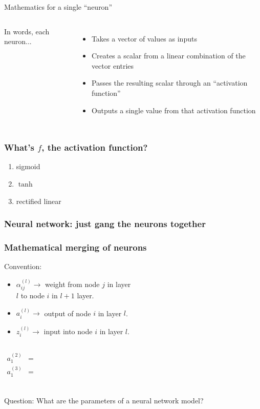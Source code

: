 \documentclass[mathserif, aspectratio=169]{beamer}
\begin{document}
\begin{frame}{Mathematics for a single ``neuron''}   
    \begin{columns}
    		In words, each neuron...
    		\begin{itemize}
    			\item Takes a vector of values as inputs
    			\item Creates a scalar from a linear combination of the vector entries
    			\item Passes the resulting scalar through an ``activation function''
    			\item Outputs a single value from that activation function
    		\end{itemize}
	    	
    \end{columns}
\end{frame}


\begin{frame}[t]\frametitle{What's $f$, the activation function?}
    \begin{enumerate}
    	\item sigmoid
    	\vspace{15mm}
    	\item $\tanh$
    	\vspace{15mm}
    	\item rectified linear
    \end{enumerate}
\end{frame}

\begin{frame}[t]\frametitle{Neural network: just gang the neurons together}
    
\end{frame}


\begin{frame}[t]\frametitle{Mathematical merging of neurons}
    Convention:
    \begin{itemize}
    	\item $\alpha_{ij}^{(l)} \rightarrow$ weight from node $j$ in layer\\ $l$ to node $i$ in $l+1$ layer.
    	\item $a_{i}^{(l)} \rightarrow$ output of node $i$ in layer $l$.
    	\item $z_i^{(l)} \rightarrow$ input into node $i$ in layer $l$.
    \end{itemize}

    \begin{columns}
    	    \begin{align*}
		     	a_1^{(2)} &= \\
		     	a_1^{(3)} &= \\
		    \end{align*}
    \end{columns}
    
    Question: What are the parameters of a neural network model?
\end{frame}
\end{document}
